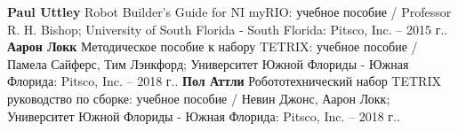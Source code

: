 
\begin{thebibliography}{2}
    \textbf{Paul Uttley} Robot Builder’s Guide for NI myRIO: учебное пособие / Professor R. H. Bishop; University of South Florida -  South Florida: Pitsco, Inc. -- 2015 г..
    \textbf{Аарон Локк} Методическое пособие к набору TETRIX: учебное пособие / Памела Сайферс, Тим Лэнкфорд; Университет Южной Флориды - Южная Флорида: Pitsco, Inc. -- 2018 г..
    \textbf{Пол Аттли} Робототехнический набор TETRIX руководство по сборке: учебное пособие / Невин Джонс, Аарон Локк; Университет Южной Флориды - Южная Флорида: Pitsco, Inc. -- 2018 г..
\end{thebibliography}
